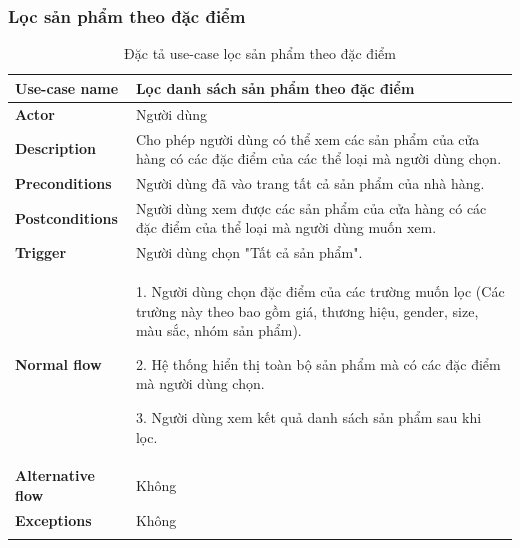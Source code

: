 \subsubsection{Lọc sản phẩm theo đặc điểm }
\begin{center}
    {
        \setlength\extrarowheight{6pt}
        \begin{longtable}{| p{} | p{} |}
            \hline
            \textbf{Use-case name}
             &
            Lọc danh sách sản phẩm theo đặc điểm
            \\
            \hline
            \textbf{Actor}
             &
            Người dùng
            \\
            \hline
            \textbf{Description}
             &
            Cho phép người dùng có thể xem các sản phẩm của cửa hàng có các đặc điểm của các thể loại mà người dùng chọn.
            \\
            \hline
            \textbf{Preconditions}
             &
            Người dùng đã vào trang tất cả sản phẩm của nhà hàng.
            \\
            \hline
            \textbf{Postconditions}
             &
            Người dùng xem được các sản phẩm của cửa hàng có các đặc điểm của thể loại mà người dùng muốn xem.
            \\
            \hline
            \textbf{Trigger}
             &
            Người dùng chọn "Tất cả sản phẩm".
            \\
            \hline
            \begin{flushleft}
                \textbf{Normal flow}
            \end{flushleft}
             &
            1. Người dùng chọn đặc điểm của các trường muốn lọc (Các trường này theo bao gồm giá, thương hiệu, gender, size, màu sắc, nhóm sản phẩm).

            2. Hệ thống hiển thị toàn bộ sản phẩm mà có các đặc điểm mà người dùng chọn.

            3. Người dùng xem kết quả danh sách sản phẩm sau khi lọc.
            \\
            \hline
            \textbf{Alternative flow}
             &
            Không
            \\
            \hline
            \textbf{Exceptions}
             &
            Không
            \\
            \hline
            \caption{Đặc tả use-case lọc sản phẩm theo đặc điểm}
        \end{longtable}
    }

\end{center}


